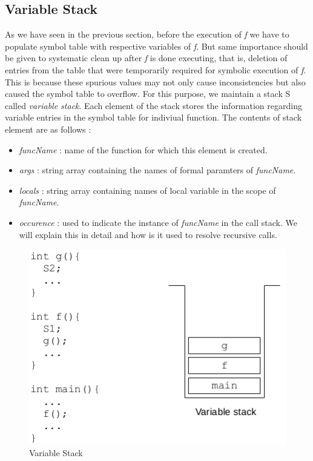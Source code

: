 \documentclass[12pt,oneside]{book}
\begin{document}
\subsection{Variable Stack}
As we have seen in the previous section, before the execution of \textit{f} we have to populate symbol table with respective variables of \textit{f}. But same importance should be given to systematic clean up after \textit{f} is done executing, that is, deletion of entries from the table that were temporarily required for symbolic execution of \textit{f}. This is because these spurious values may not only cause inconsistencies but also caused the symbol table to overflow. 
For this purpose, we maintain a stack S called \textit{variable stack}. Each element of the stack stores the information regarding variable entries in the symbol table for indiviual function. The contents of stack element are as follows : 
\begin{itemize}
 \item \textit{funcName} : name of the function for which this element is created.
 \item \textit{args} : string array containing the names of formal paramters of \textit{funcName}.
  \item \textit{locals} : string array containing names of local variable in the scope of \textit{funcName}.
  \item \textit{occurence} : used to indicate the instance of \textit{funcName} in the call stack. We will explain this in detail and how is it used to resolve recursive calls. 
\end{itemize}

\vspace{0.3cm}
\begin{figure}[htbp]
\centering
\includegraphics[scale=0.60]{stack.png}
\caption{Variable Stack}
\end{figure}
\end{document}
